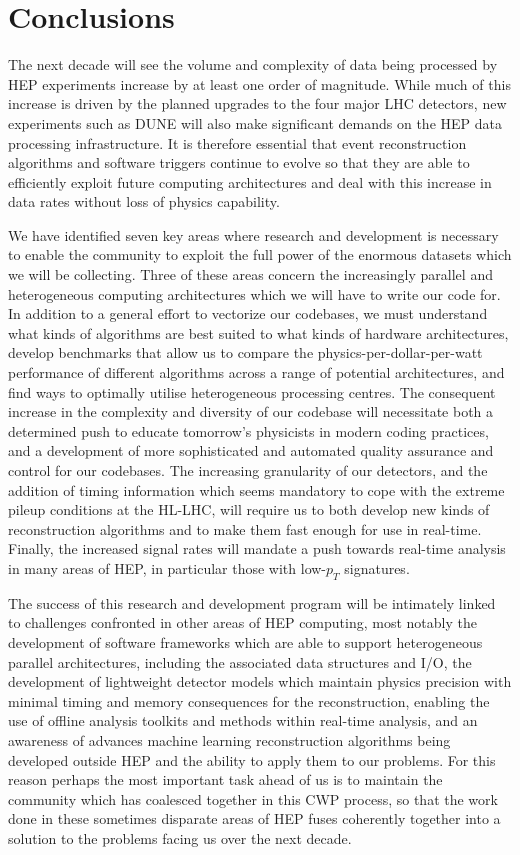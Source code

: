 \section{Conclusions}

The next decade will see the volume and complexity of data being processed by HEP experiments increase by at least one order of magnitude. While much of this increase is driven by the planned upgrades to the four major LHC detectors, new experiments such as DUNE will also make significant demands on the HEP data processing infrastructure. It is therefore essential that event reconstruction algorithms and software triggers continue to evolve so that they are able to efficiently exploit future computing architectures and deal with this increase in data rates without loss of physics capability. 

We have identified seven key areas where research and development is necessary to enable the community to exploit the full power of the enormous datasets which we will be collecting. Three of these areas concern the increasingly parallel and heterogeneous computing architectures which we will have to write our code for. In addition to a general effort to vectorize our codebases, we must understand what kinds of algorithms are best suited to what kinds of hardware architectures, develop benchmarks that allow us to compare the physics-per-dollar-per-watt performance of different algorithms across a range of potential architectures, and find ways to optimally utilise heterogeneous processing centres. The consequent increase in the complexity and diversity of our codebase will necessitate both a determined push to educate tomorrow’s physicists in modern coding practices, and a development of more sophisticated and automated quality assurance and control for our codebases. The increasing granularity of our detectors, and the addition of timing information which seems mandatory to cope with the extreme pileup conditions at the HL-LHC, will require us to both develop new kinds of reconstruction algorithms and to make them fast enough for use in real-time. Finally, the increased signal rates will mandate a push towards real-time analysis in many areas of HEP, in particular those with low-$p_T$ signatures.

The success of this research and development program will be intimately linked to challenges confronted in other areas of HEP computing, most notably the development of software frameworks which are able to support heterogeneous parallel architectures, including the associated data structures and I/O, the development of lightweight detector models which maintain physics precision with minimal timing and memory consequences for the reconstruction, enabling the use of offline analysis toolkits and methods within real-time analysis, and an awareness of advances machine learning reconstruction algorithms being developed outside HEP and the ability to apply them to our problems. For this reason perhaps the most important task ahead of us is to maintain the community which has coalesced together in this CWP process, so that the work done in these sometimes disparate areas of HEP fuses coherently together into a solution to the problems facing us over the next decade.


